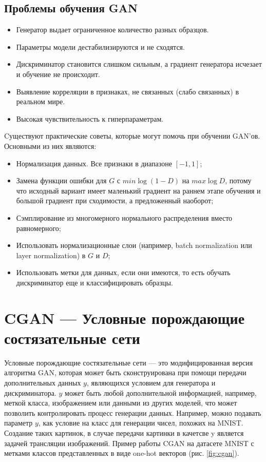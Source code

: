 \documentclass{article}
\theoremstyle{definition}
\theoremstyle{theorem}
\theoremstyle{remark}
\theoremstyle{theorem}
\theoremstyle{example}
\theoremstyle{theorem}
\theoremstyle{theorem}
\theoremstyle{theorem}
\theoremstyle{theorem}
\begin{document}
\newpage

\subsection{Проблемы обучения GAN}

\begin{itemize}
	\item Генератор  выдает ограниченное количество разных образцов.
	\item Параметры модели дестабилизируются и не сходятся.
	\item Дискриминатор становится слишком сильным, а градиент генератора исчезает и обучение не происходит.
	\item Выявление корреляции в признаках, не связанных (слабо связанных) в реальном мире.
	\item Высокая чувствительность к гиперпараметрам.
\end{itemize}

Cуществуют практические советы, которые могут помочь при обучении GAN'ов. Основными из них являются:

\begin{itemize}
	\item Нормализация данных. Все признаки в диапазоне $[-1,1]$;
	\item Замена функции ошибки для $G$ с $min\log(1-D)$ на $max\log D$, потому что исходный вариант имеет маленький градиент на раннем этапе обучения и большой градиент при сходимости, а предложенный наоборот;
	\item Сэмплирование из многомерного нормального распределения вместо равномерного;
	\item Использовать нормализационные слои (например, batch normalization или layer normalization) в $G$ и $D$;
	\item Использовать метки для данных, если они имеются, то есть обучать дискриминатор еще и классифицировать образцы.
\end{itemize}

\newpage

\section{CGAN --- Условные порождающие состязательные сети}

Условные порождающие состязательные сети --- это модифицированная версия алгоритма GAN, которая может быть сконструирована при помощи передачи дополнительных данных $y$, являющихся условием для генератора и дискриминатора. $y$ может быть любой дополнительной информацией, например, меткой класса, изображением или данными из других моделей, что может позволить контролировать процесс генерации данных. Например, можно подавать параметр $y$, как условие на класс для генерации чисел, похожих на MNIST. Создание таких картинок, в случае передачи картинки в качетсве y является задачей трансляции изображений. Пример работы CGAN на датасете MNIST с метками классов представленных в виде one-hot векторов (рис. \ref{fig:cgan}).
\end{document}
